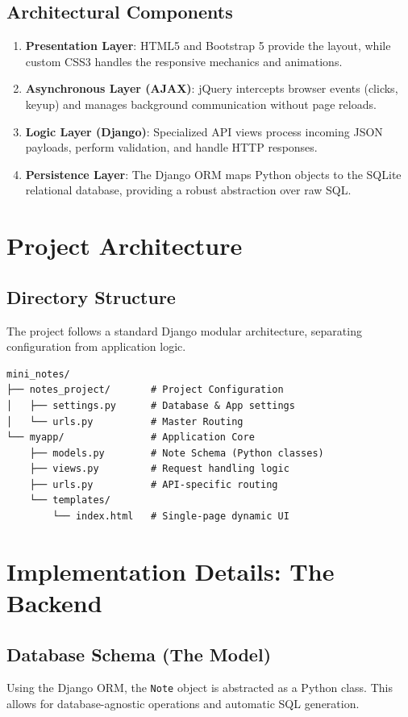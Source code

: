 \documentclass[11pt,a4paper]{article}
\begin{document}
\subsection{Architectural Components}
\begin{enumerate}
    \item \textbf{Presentation Layer}: HTML5 and Bootstrap 5 provide the layout, while custom CSS3 handles the responsive mechanics and animations.
    \item \textbf{Asynchronous Layer (AJAX)}: jQuery intercepts browser events (clicks, keyup) and manages background communication without page reloads.
    \item \textbf{Logic Layer (Django)}: Specialized API views process incoming JSON payloads, perform validation, and handle HTTP responses.
    \item \textbf{Persistence Layer}: The Django ORM maps Python objects to the SQLite relational database, providing a robust abstraction over raw SQL.
\end{enumerate}

\section{Project Architecture}
\subsection{Directory Structure}
The project follows a standard Django modular architecture, separating configuration from application logic.

\begin{lstlisting}[caption=Standardized File Hierarchy]
mini_notes/
├── notes_project/       # Project Configuration
│   ├── settings.py      # Database & App settings
│   └── urls.py          # Master Routing
└── myapp/               # Application Core
    ├── models.py        # Note Schema (Python classes)
    ├── views.py         # Request handling logic
    ├── urls.py          # API-specific routing
    └── templates/       
        └── index.html   # Single-page dynamic UI
\end{lstlisting}

\newpage
\section{Implementation Details: The Backend}
\subsection{Database Schema (The Model)}
Using the Django ORM, the \texttt{Note} object is abstracted as a Python class. This allows for database-agnostic operations and automatic SQL generation.
\end{document}
